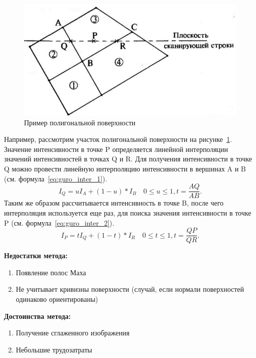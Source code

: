 \documentclass[a4paper,14pt,unknownkeysallowed]{extreport}
\begin{document}
\begin{figure}[H]
	\centering
	\includegraphics{guro}
	\caption{Пример полигональной поверхности}
	\label{fig:guro_polygon}
\end{figure} 

Например, рассмотрим участок полигональной поверхности на рисунке~\ref{fig:guro_polygon}.
Значение интенсивности в точке P
определяется линейной интерполяции значений интенсивностей в точках Q и R.
Для получения интенсивности в точке Q можно провести линейную интерполяцию интенсивности в вершинах A и B (см. формула~\ref{eq:guro_inter_1}).
\begin{equation} 
	I_Q = uI_A+(1-u)*I_B  \quad 0 \leq u \leq 1, t = \frac{AQ}{AB}.
	\label{eq:guro_inter_1}
\end{equation}
Таким же образом рассчитывается интенсивность в точке B, после чего интерполяция используется еще раз, для поиска значения интенсивности в точке P 
(см. формула~\ref{eq:guro_inter_2}). \cite{Rodgers}
\begin{equation} 
	I_P = tI_Q+(1-t)*I_R  \quad 0 \leq t \leq 1, t = \frac{QP}{QR}.
	\label{eq:guro_inter_2}
\end{equation}

\textbf{Недостатки метода:}
\begin{enumerate}
	\item Появление полос Маха 
	\item Не учитывает кривизны поверхности (случай, если нормали поверхностей одинаково ориентированы)
\end{enumerate}

\textbf{Достоинства метода:}
\begin{enumerate}
	\item Получение сглаженного изображения
	\item Небольшие трудозатраты
\end{enumerate}
\end{document}

